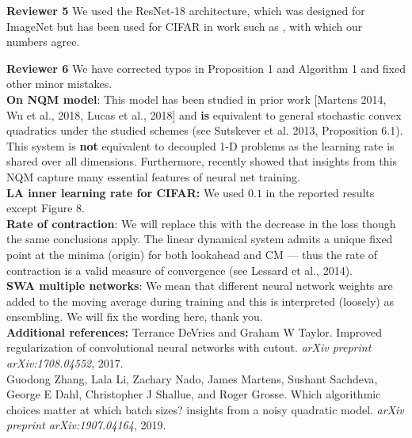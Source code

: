 \documentclass{article}
\begin{document}
\textbf{Reviewer 5} \hspace{0.1cm}
We used the ResNet-18 architecture, which was designed for ImageNet but has been used for CIFAR in work such as \citet{devries2017improved}, with which our numbers agree. %

\textbf{Reviewer 6} \hspace{0.1cm} We have corrected typos in Proposition 1 and Algorithm 1 and fixed other minor mistakes.\\
\textbf{On NQM model}: This model has been studied in prior work [Martens 2014, Wu et al., 2018, Lucas et al., 2018] and \textbf{is} equivalent to general stochastic convex quadratics under the studied schemes (see Sutskever et al. 2013, Proposition 6.1). This system is \textbf{not} equivalent to decoupled 1-D problems as the learning rate is shared over all dimensions. Furthermore, \citep{zhang2019algorithmic} recently showed that insights from this NQM capture many essential features of neural net training. \\
\textbf{LA inner learning rate for CIFAR:} We used $0.1$ in the reported results except Figure 8. \\
\textbf{Rate of contraction}: We will replace this with the decrease in the loss though the same conclusions apply. The linear dynamical system admits a unique fixed point at the minima (origin) for both lookahead and CM --- thus the rate of contraction is a valid measure of convergence (see Lessard et al., 2014).\\
\textbf{SWA multiple networks}: We mean that different neural network weights are added to the moving average during training and this is interpreted (loosely) as ensembling. We will fix the wording here, thank you. \\
\textbf{Additional references:} Terrance DeVries and Graham W Taylor. Improved regularization of convolutional neural networks with cutout. \textit{arXiv preprint arXiv:1708.04552}, 2017. \\
Guodong Zhang, Lala Li, Zachary Nado, James Martens, Sushant Sachdeva, George E Dahl, Christopher J Shallue, and Roger Grosse. Which algorithmic choices matter at which batch sizes? insights from a noisy quadratic model. \textit{arXiv preprint arXiv:1907.04164}, 2019.




\end{document}
